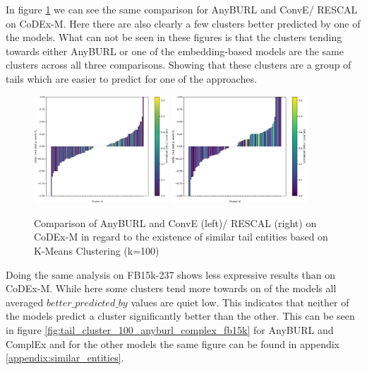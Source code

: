In figure \ref{fig:tail_cluster_100_anyburl_conve_rescal_codex} we can see the same comparison for AnyBURL and ConvE/ RESCAL on CoDEx-M. Here there are also clearly a few clusters better predicted by one of the models. What can not be seen in these figures is that the clusters tending towards either AnyBURL or one of the embedding-based models are the same clusters across all three comparisons. Showing that these clusters are a group of tails which are easier to predict for one of the approaches.  

\begin{figure}[H]
\centering
\includegraphics[width=0.45\textwidth]{images/tail_cluster_100_anyburl_conve_codex.PNG}
\includegraphics[width=0.45\textwidth]{images/tail_cluster_100_anyburl_rescal_codex.PNG}
\caption{Comparison of AnyBURL and ConvE (left)/ RESCAL (right) on CoDEx-M in regard to the existence of similar tail entities based on K-Means Clustering (k=100)}
\label{fig:tail_cluster_100_anyburl_conve_rescal_codex}
\end{figure}

Doing the same analysis on FB15k-237 shows less expressive results than on CoDEx-M. While here some clusters tend more towards on of the models all averaged $better\_predicted\_by$ values are quiet low. This indicates that neither of the models predict a cluster significantly better than the other. This can be seen in figure \ref{fig:tail_cluster_100_anyburl_complex_fb15k} for AnyBURL and ComplEx and for the other models the same figure can be found in appendix \ref{appendix:similar_entities}.

